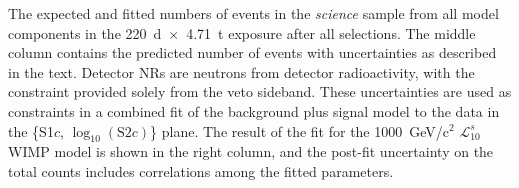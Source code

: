 \begin{table}[th]
    \centering
    \caption{The expected and fitted numbers of events in the \emph{science} sample from all model components in the 220~d~$\times$~4.71~t exposure after all selections.
    The middle column contains the predicted number of events with uncertainties as described in the text. Detector NRs are neutrons from detector radioactivity, with the constraint provided solely from the veto sideband. 
    These uncertainties are used as constraints in a combined fit of the background plus signal model to the data in the \{S1$c$, $\log_{10}(\mathrm{S}2c)$\} plane.  
    The result of the fit for the 1000~GeV/c$^2$ $\mathcal{L}^s_{10}$ WIMP model is shown in the right column, and the post-fit uncertainty on the total counts includes correlations among the fitted parameters.
    }
    

\end{table}
